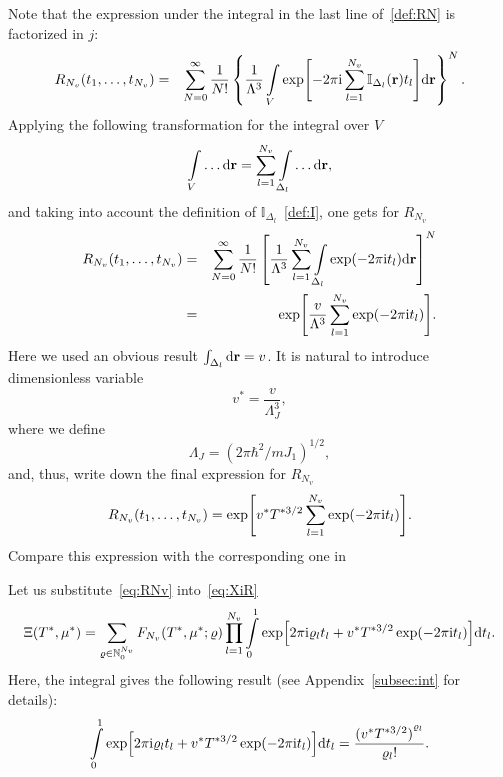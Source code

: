 \documentclass[12pt]{article}
\numberwithin{equation}{section}
\begin{document}
	Note that the expression under the integral in the last line of~\eqref{def:RN} is factorized in $j$:
	\begin{eqnarray}
		R_{N_v}(t_1, \ldots, t_{N_v}) & = & \sum_{N=0}^{\infty}\frac{1}{N!} 
		\left\{\frac{1}{\Lambda^{3}} \int\limits_V \exp[-2\pi{\rm i}\sum_{l=1}^{N_v} \mathbb{I}_{\Delta_{l}}(\vb{r}) t_l] {\rm d} \vb{r} \right\}^N.
	\end{eqnarray}
	Applying the following transformation for the integral over $V$
	\begin{equation}
		\int\limits_V \ldots {\rm d} \vb{r} = \sum_{l=1}^{N_v}\int\limits_{\Delta_l} \ldots {\rm d} \vb{r},
	\end{equation}
	and taking into account the definition of $\mathbb{I}_{\Delta_l}$~\eqref{def:I}, one gets for $R_{N_v}$
	\begin{eqnarray}
		\label{eq:RNL}
		R_{N_v}(t_1, \ldots, t_{N_v}) & = & \sum_{N=0}^{\infty}\frac{1}{N!} \left[ \frac{1}{\Lambda^3} \sum_{l=1}^{N_v} \int\limits_{\Delta_l} \exp(-2\pi{\rm i}t_l) {\rm d} \vb{r} \right]^N
		\nonumber\\
		&=& \exp[\frac{v}{\Lambda^3} \sum_{l=1}^{N_v} \exp(-2\pi{\rm i} t_l)].
	\end{eqnarray}
	Here we used an obvious result $\int_{\Delta_l} {\rm d} \vb{r} = v$. It is natural to introduce dimensionless variable
	\begin{equation}
		\label{def:v_star}
		v^* = \frac{v}{\Lambda^3_J},
	\end{equation}
	where we define
	\begin{equation}
		\Lambda_J = (2\pi\hbar^2/mJ_1)^{1/2},
	\end{equation}
	and, thus, write down the final expression for $R_{N_v}$
	\begin{equation}
		\label{eq:RNv}
		R_{N_v}(t_1, \ldots, t_{N_v}) = \exp[v^* T^{*3/2} \sum_{l=1}^{N_v} \exp(-2\pi{\rm i} t_l)].
	\end{equation}
	Compare this expression with the corresponding one in~\cite[p.~4]{KKD20} 
	
	Let us substitute~\eqref{eq:RNv} into~\eqref{eq:XiR}
	\begin{equation}
		\label{eq:XiIntt}
		\Xi(T^*,\mu^*) = \sum_{\varrho \in \mathbb{N}_0^{N_v}} F_{N_v}(T^*, \mu^*; \varrho) \prod\limits_{l=1}^{N_v} \int\limits_{0}^{1} \exp[2\pi{\rm i}\varrho_l t_l + v^* T^{*3/2} \exp(-2\pi{\rm i} t_l)] {\rm d} t_l.
	\end{equation}
	Here, the integral gives the following result (see Appendix~\ref{subsec:int} for details):
	\begin{equation}
		\label{integral1}
		\int\limits_{0}^{1} \exp[2\pi{\rm i}\varrho_l t_l + v^* T^{*3/2} \exp(-2\pi{\rm i} t_l)] {\rm d} t_l = \frac{{(v^* T^{*3/2})}^{\varrho_l}}{\varrho_l !}.
	\end{equation}
	
\end{document}
